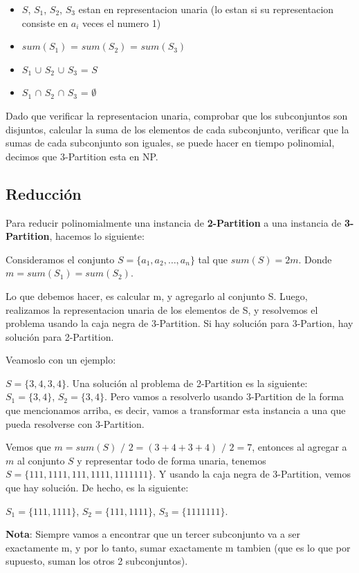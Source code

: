 \begin{itemize}
    \item $S$, $S_1$, $S_2$, $S_3$ estan en representacion unaria (lo estan si su representacion consiste en $a_i$ veces el numero 1)
    \item $sum(S_1)$ = $sum(S_2)$ = $sum(S_3)$
    \item $S_1$ $\cup$ $S_2$ $\cup$ $S_3$ = $S$
    \item $S_1$ $\cap$ $S_2$ $\cap$ $S_3$ = $\emptyset$
\end{itemize}

Dado que verificar la representacion unaria, comprobar que los subconjuntos son disjuntos, calcular la suma de los elementos de cada subconjunto, verificar que la sumas de cada subconjunto son iguales, se puede hacer en tiempo polinomial, decimos que 3-Partition esta en NP.

\subsection*{Reducción}

Para reducir polinomialmente una instancia de \textbf{2-Partition} a una instancia de \textbf{3-Partition}, hacemos lo siguiente:

Consideramos el conjunto \( S = \{a_1, a_2, \dots, a_n\} \) tal que $sum(S) = 2m$. Donde $m = sum(S_1) = sum(S_2)$.

Lo que debemos hacer, es calcular m, y agregarlo al conjunto S. Luego, realizamos la representacion unaria de los elementos de S, y resolvemos el problema usando la caja negra de 3-Partition. Si hay solución para 3-Partion, hay solución para 2-Partition.

Veamoslo con un ejemplo:

$S = \{3, 4, 3, 4\}$. Una solución al problema de 2-Partition es la siguiente: $S_1 = \{3, 4\}$, $S_2 = \{3, 4\}$. Pero vamos a resolverlo usando 3-Partition de la forma que mencionamos arriba, es decir, vamos a transformar esta instancia a una que pueda resolverse con 3-Partition.

Vemos que $m = sum(S)$ $/$ $2 = (3 + 4 + 3 + 4)$ $/$ $2 = 7$, entonces al agregar a $m$ al conjunto $S$ y representar todo de forma unaria, tenemos $S = \{111, 1111, 111, 1111, 1111111\}$. Y usando la caja negra de 3-Partition, vemos que hay solución. De hecho, es la siguiente:

$S_1 = \{111, 1111\}$, $S_2 = \{111, 1111\}$, $S_3 = \{1111111\}$.

\textbf{Nota}: Siempre vamos a encontrar que un tercer subconjunto va a ser exactamente m, y por lo tanto, sumar exactamente m tambien (que es lo que por supuesto, suman los otros 2 subconjuntos).

